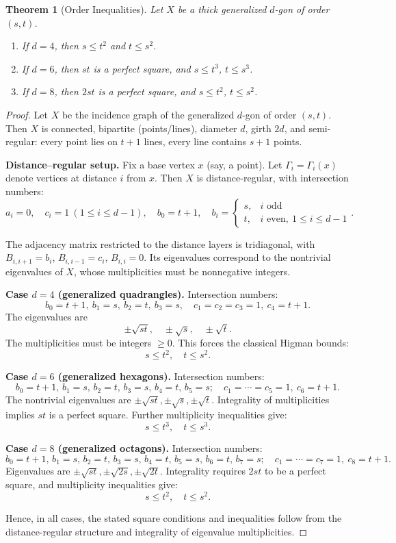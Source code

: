 \documentclass[12pt,a4paper,openany]{book}
\newtheorem{theorem}{Theorem}[section]
\begin{document}
\begin{theorem}[Order Inequalities]\label{thm:order-inequalities}
Let $X$ be a thick generalized $d$-gon of order $(s,t)$.
\begin{enumerate}
    \item If $d = 4$, then $s \leq t^2$ and $t \leq s^2$.
    \item If $d = 6$, then $st$ is a perfect square, and $s \leq t^3$, $t \leq s^3$.
    \item If $d = 8$, then $2st$ is a perfect square, and $s \leq t^2$, $t \leq s^2$.
\end{enumerate}
\end{theorem}

\begin{proof}
Let $X$ be the incidence graph of the generalized $d$-gon of order $(s,t)$.  
Then $X$ is connected, bipartite (points/lines), diameter $d$, girth $2d$, and semi-regular: every point lies on $t+1$ lines, every line contains $s+1$ points.

\smallskip
\textbf{Distance–regular setup.}  
Fix a base vertex $x$ (say, a point). Let $\Gamma_i=\Gamma_i(x)$ denote vertices at distance $i$ from $x$. Then $X$ is distance-regular, with intersection numbers:
\[
a_i = 0,\quad c_i = 1 \ (1\le i \le d-1), \quad b_0 = t+1, \quad b_i = 
\begin{cases}
s,& i\text{ odd}\\
t,& i\text{ even},\ 1\le i\le d-1
\end{cases}.
\]

The adjacency matrix restricted to the distance layers is tridiagonal, with $B_{i,i+1}=b_i$, $B_{i,i-1}=c_i$, $B_{i,i}=0$. Its eigenvalues correspond to the nontrivial eigenvalues of $X$, whose multiplicities must be nonnegative integers.

\smallskip
\textbf{Case $d=4$ (generalized quadrangles).}  
Intersection numbers:
\[
b_0=t+1,\ b_1=s,\ b_2=t,\ b_3=s,\quad c_1=c_2=c_3=1,\ c_4=t+1.
\]
The eigenvalues are
\[
\pm\sqrt{st},\quad \pm\sqrt{s},\quad \pm\sqrt{t}.
\]
The multiplicities must be integers $\ge 0$. This forces the classical Higman bounds:
\[
s \le t^2,\quad t \le s^2.
\]

\smallskip
\textbf{Case $d=6$ (generalized hexagons).}  
Intersection numbers:
\[
b_0=t+1,\,b_1=s,\,b_2=t,\,b_3=s,\,b_4=t,\,b_5=s;\quad
c_1=\cdots=c_5=1,\ c_6=t+1.
\]
The nontrivial eigenvalues are $\pm\sqrt{st}, \pm\sqrt{s}, \pm\sqrt{t}$.  
Integrality of multiplicities implies $st$ is a perfect square.  
Further multiplicity inequalities give:
\[
s \le t^3,\quad t \le s^3.
\]

\smallskip
\textbf{Case $d=8$ (generalized octagons).}  
Intersection numbers:
\[
b_0=t+1,\,b_1=s,\,b_2=t,\,b_3=s,\,b_4=t,\,b_5=s,\,b_6=t,\,b_7=s;\quad
c_1=\cdots=c_7=1,\ c_8=t+1.
\]
Eigenvalues are $\pm\sqrt{st}, \pm\sqrt{2s}, \pm\sqrt{2t}$.  
Integrality requires $2st$ to be a perfect square, and multiplicity inequalities give:
\[
s \le t^2,\quad t \le s^2.
\]

\smallskip
Hence, in all cases, the stated square conditions and inequalities follow from the distance-regular structure and integrality of eigenvalue multiplicities.
\end{proof}
\end{document}
